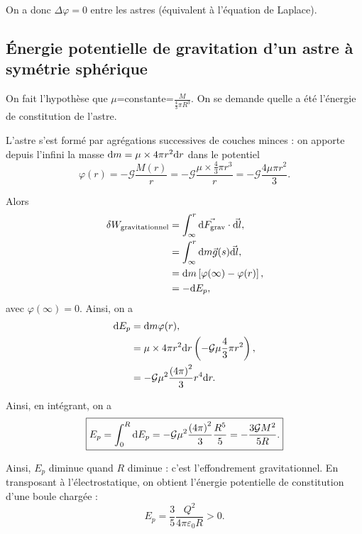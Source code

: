     On a donc $\Delta \varphi=0$ entre les astres (équivalent à l'équation de Laplace).

    \subsection{Énergie potentielle de gravitation d'un astre à symétrie sphérique}

        On fait l'hypothèse que $\mu$=constante=$\frac{M}{\frac{4}{3}\pi R^{3}}$. On se demande quelle a été l'énergie de constitution de l'astre.

        L'astre s'est formé par agrégations successives de couches minces : on apporte depuis l'infini la masse $\mathrm{d} m=\mu\times 4\pi r^{2}\mathrm{d} r$ dans le potentiel 
        \begin{equation}
            \varphi(r)=-\mathcal{G}\frac{M(r)}{r}=-\mathcal{G}\frac{\mu\times\frac{4}{3}\pi r^{3}}{r}=-\mathcal{G}\frac{4\mu\pi r^{2}}{3}.
        \end{equation}

        Alors 
        \begin{align}
            \delta W_{\text{gravitationnel}}
            &=\int_{\infty}^{r}\vec{\mathrm{d} F_{\text{grav}}}\cdot\vec{\mathrm{d} l},\\
            &=\int_{\infty}^{r}\mathrm{d} m\vec{g}(s)\vec{\mathrm{d} l},\\
            &=
            \mathrm{d} m\left[
                \varphi(\infty)-\varphi(r)
            \right],\\
            &=
            -\mathrm{d} E_p,
        \end{align}
        avec $\varphi(\infty)=0$. Ainsi, on a 
        \begin{align}
            \mathrm{d} E_p
            &=
            \mathrm{d} m\varphi(r),\\
            &=
            \mu\times 4\pi r^{2}\mathrm{d} r\left(-\mathcal{G}\mu\frac{4}{3}\pi r^{2}\right),\\
            &=
            -\mathcal{G}\mu^{2}\frac{\left(4\pi\right)^{2}}{3}r^{4}\mathrm{d} r.
        \end{align}

        Ainsi, en intégrant, on a 
        \begin{equation}
            \boxed{
                E_p=\int_{0}^{R}\mathrm{d} E_p=-\mathcal{G}\mu^{2}\frac{\left(4\pi\right)^{2}}{3}\frac{R^{5}}{5}=-\frac{3\mathcal{G}M^{2}}{5R}.
            }
        \end{equation}

        Ainsi, $E_p$ diminue quand $R$ diminue : c'est l'effondrement gravitationnel. En transposant à l'électrostatique, on obtient l'énergie potentielle de constitution d'une boule chargée :
        \begin{equation}
            \boxed{
                E_p=\frac{3}{5}\frac{Q^{2}}{4\pi\varepsilon_0 R}>0.
            }
        \end{equation}